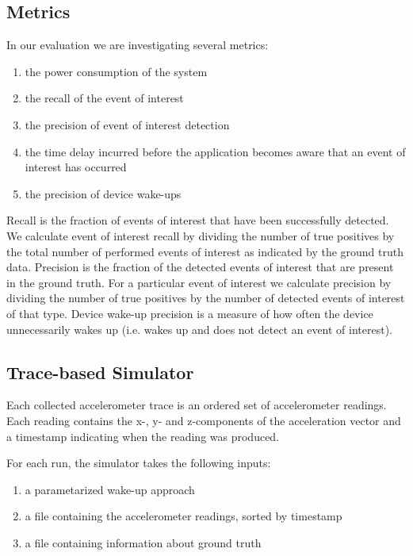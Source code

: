\subsection{Metrics}
In our evaluation we are investigating several metrics:

\begin{enumerate}
\setlength{\itemsep}{-3pt}  

\item the power consumption of the system

\item the recall of the event of interest

\item the precision of event of interest detection

\item the time delay incurred before the application becomes aware that an event of interest has occurred

\item the precision of device wake-ups

\end{enumerate}

Recall is the fraction of events of interest that have been successfully detected. We calculate event of interest recall by dividing the number of true positives by the total number of performed events of interest as indicated by the ground truth data. Precision is the fraction of the detected events of interest that are present in the ground truth. For a particular event of interest we calculate precision by dividing the number of true positives by the number of detected events of interest of that type. Device wake-up precision is a measure of how often the device unnecessarily wakes up (i.e. wakes up and does not detect an event of interest).

\subsection{Trace-based Simulator}

Each collected accelerometer trace is an ordered set of accelerometer readings. Each reading contains the x-, y- and z-components of the acceleration vector and a timestamp indicating  when the reading was produced.

For each run, the simulator takes the following inputs:

\begin{enumerate}
\setlength{\itemsep}{-3pt}  

\item a parametarized wake-up approach

\item a file containing the accelerometer readings, sorted by timestamp

\item a file containing information about ground truth

\end{enumerate}

